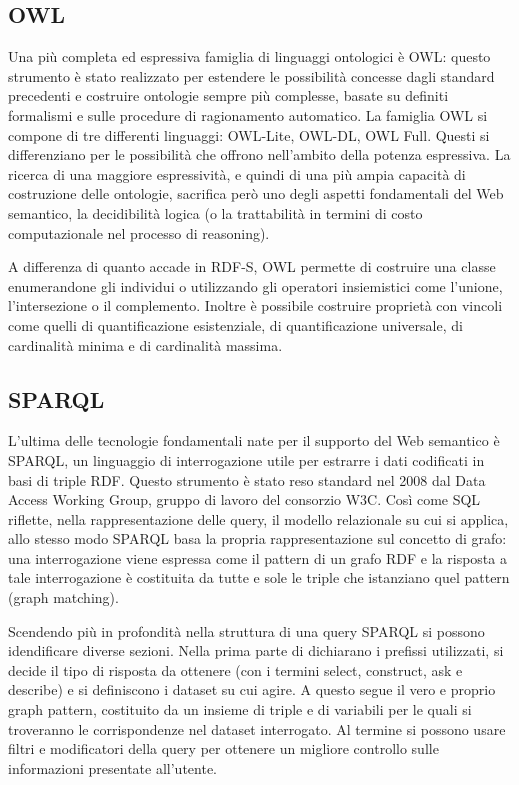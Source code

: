\documentclass[Lau,binding=0.6cm,noexaminfo,oneside]{sapthesis}
\begin{document}
\subsection{OWL}
Una più completa ed espressiva famiglia di linguaggi ontologici è OWL: questo strumento è stato realizzato per estendere le possibilità concesse dagli standard precedenti e costruire ontologie sempre più complesse, basate su definiti formalismi e sulle procedure di ragionamento automatico. La famiglia OWL si compone di tre differenti linguaggi: OWL-Lite, OWL-DL, OWL Full.
Questi si differenziano per le possibilità che offrono nell'ambito della potenza espressiva. La ricerca di una maggiore espressività, e quindi di una più ampia capacità di costruzione delle ontologie, sacrifica però uno degli aspetti fondamentali del Web semantico, la decidibilità logica (o la trattabilità in termini di costo computazionale nel processo di reasoning).\medskip

A differenza di quanto accade in RDF-S, OWL permette di costruire una classe enumerandone gli individui o utilizzando gli operatori insiemistici come l'unione, l'intersezione o il complemento. Inoltre è possibile costruire proprietà con vincoli come quelli di quantificazione esistenziale,  di quantificazione universale, di cardinalità minima e di cardinalità massima.\medskip

\subsection{SPARQL}
L'ultima delle tecnologie fondamentali nate per il supporto del Web semantico è SPARQL, un linguaggio di interrogazione utile per estrarre i dati codificati in basi di triple RDF. Questo strumento è stato reso standard nel 2008 dal Data Access Working Group, gruppo di lavoro del consorzio W3C. Così come SQL riflette, nella rappresentazione delle query, il modello relazionale su cui si applica, allo stesso modo SPARQL basa la propria rappresentazione sul concetto di grafo: una interrogazione viene espressa come il pattern di un grafo RDF e la risposta a tale interrogazione è costituita da tutte e sole le triple che istanziano quel pattern (graph matching).\medskip

Scendendo più in profondità nella struttura di una query SPARQL si possono idendificare diverse sezioni. Nella prima parte di dichiarano i prefissi utilizzati, si decide il tipo di risposta da ottenere (con i termini select, construct, ask e describe) e si definiscono i dataset su cui agire. A questo segue il vero e proprio graph pattern, costituito da un insieme di triple e di variabili per le quali si troveranno le corrispondenze nel dataset interrogato. Al termine si possono usare filtri e modificatori della query per ottenere un migliore controllo sulle informazioni presentate all'utente.\medskip
\end{document}
